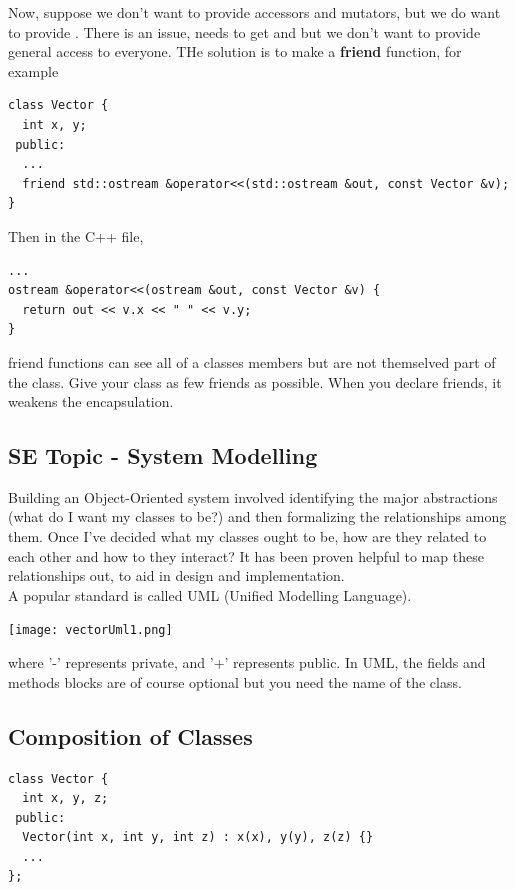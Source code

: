 \documentclass[english, 11pt]{article}
\begin{document}
Now, suppose we don't want to provide accessors and mutators, but we do want to provide . There is an issue,  needs to get  and  but we don't want to provide general access to everyone. THe solution is to make  a \textbf{friend} function, for example
\begin{lstlisting}
class Vector {
  int x, y;
 public:
  ...
  friend std::ostream &operator<<(std::ostream &out, const Vector &v);
}
\end{lstlisting}
Then in the C++ file,
\begin{lstlisting}
...
ostream &operator<<(ostream &out, const Vector &v) {
  return out << v.x << " " << v.y;
}
\end{lstlisting}
friend functions can see all of a classes members but are not themselved part of the class. Give your class as few friends as possible. When you declare friends, it weakens the encapsulation.

\subsection{SE Topic - System Modelling}

Building an Object-Oriented system involved identifying the major abstractions (what do I want my classes to be?) and then formalizing the relationships among them. Once I've decided what my classes ought to be, how are they related to each other and how to they interact? It has been proven helpful to map these relationships out, to aid in design and implementation. \\

A popular standard is called UML (Unified Modelling Language).

\begin{center}
  \texttt{[image: vectorUml1.png]}
\end{center}

where '-' represents private, and '+' represents public. In UML, the fields and methods blocks are of course optional but you need the name of the class.

\subsection{Composition of Classes}

\begin{lstlisting}
class Vector {
  int x, y, z;
 public:
  Vector(int x, int y, int z) : x(x), y(y), z(z) {}
  ...
};
\end{lstlisting}
\end{document}
